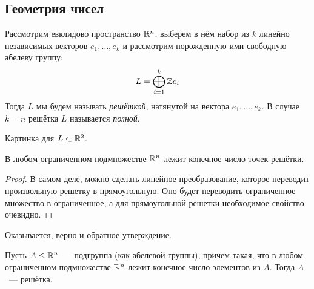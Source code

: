 
\subsection{Геометрия чисел}

	Рассмотрим евклидово пространство $\mathbb{R}^n$, выберем в нём набор из $k$ линейно независимых векторов $e_1, \ldots, e_k$ и рассмотрим порожденную ими свободную абелеву группу:
	\[ 
		L = \bigoplus_{i = 1}^{k} \mathbb{Z} e_i 
	\]
	Тогда $L$ мы будем называть \emph{решёткой}, натянутой на вектора $e_1, \ldots, e_k$. В случае $k = n$ решётка $L$ называется \emph{полной}. 

	\begin{example}
		Картинка для $L \subset \mathbb{R}^2$.
	\end{example}

	\begin{statement}\label{finite_points_of_lattice} 
		В любом ограниченном подмножестве $\mathbb{R}^n$ лежит конечное число точек решётки. 
	\end{statement}

	\begin{proof}
		В самом деле, можно сделать линейное преобразование, которое переводит произвольную решетку в прямоугольную. Оно будет переводить ограниченное множество в ограниченное, а для прямоугольной решетки необходимое свойство очевидно. 
	\end{proof}

	Оказывается, верно и обратное утверждение. 

	\begin{statement}\label{discrete_subgroup_is_lattice} 
		Пусть $A \le \mathbb{R}^n$~--- подгруппа (как абелевой группы), причем такая, что в любом ограниченном подмножестве $\mathbb{R}^n$ лежит конечное число элементов из $A$. Тогда $A$~--- решётка. 
	\end{statement}

